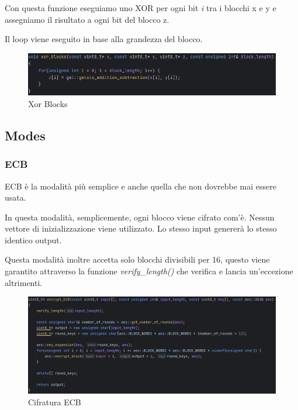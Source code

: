 \textsf{\small Con questa funzione eseguiamo uno XOR per ogni bit \emph{i} tra i blocchi x e y e assegniamo il risultato a ogni bit del blocco z. }

\textsf{\small Il loop viene eseguito in base alla grandezza del blocco.}

\begin{figure}[H]
	\centering
	\includegraphics[width=1\textwidth, height=1\textheight, keepaspectratio]{./images/code/cpp/key_expansion/xor_blocks.PNG}
	\caption{Xor Blocks}
	\label{fig:xor_blocks}
\end{figure}


\subsection{Modes}

\textsf{\small } %


\subsubsection{ECB}

\textsf{\small ECB è la modalità più semplice e anche quella che non dovrebbe mai essere usata.} %

\textsf{\small In questa modalità, semplicemente, ogni blocco viene cifrato com'è. Nessun vettore di inizializzazione viene utilizzato. Lo stesso input genererà lo stesso identico output.}

\textsf{\small Questa modalità inoltre accetta solo blocchi divisibili per 16, questo viene garantito attraverso la funzione \emph{verify\_length()} che verifica e lancia un'eccezione altrimenti.}

\begin{figure}[H]
	\centering
	\includegraphics[width=1\textwidth, height=1\textheight, keepaspectratio]{./images/code/cpp/modes/encrypt_ECB.PNG}
	\caption{Cifratura ECB}
	\label{fig:encrypt_ECB}
\end{figure}

